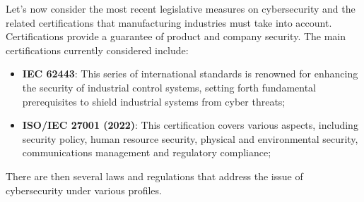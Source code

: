 Let's now consider the most recent legislative measures on cybersecurity and the related certifications that manufacturing industries must take into account.\\
Certifications provide a guarantee of product and company security. The main certifications currently considered include:
\begin{itemize}
  \item \textbf{IEC 62443}: This series of international standards is renowned for enhancing the security of industrial control systems, setting forth fundamental prerequisites to shield industrial systems from cyber threats;
  \item \textbf{ISO/IEC 27001 (2022)}: This certification covers various aspects, including security policy, human resource security, physical and environmental security, communications management and regulatory compliance;
\end{itemize}

There are then several laws and regulations that address the issue of cybersecurity under various profiles.

